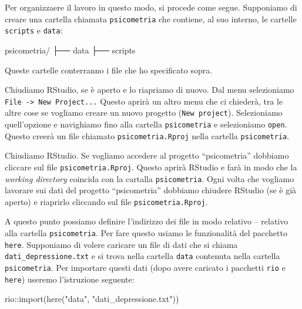 \documentclass[
]{memoir}
\newenvironment{Shaded}{\begin{snugshade}}{\end{snugshade}}
\newcommand{\FunctionTok}[1]{\textcolor[rgb]{0.00,0.00,0.00}{#1}}
\newcommand{\NormalTok}[1]{#1}
\newcommand{\SpecialCharTok}[1]{\textcolor[rgb]{0.00,0.00,0.00}{#1}}
\newcommand{\StringTok}[1]{\textcolor[rgb]{0.31,0.60,0.02}{#1}}
\theoremstyle{definition}
\theoremstyle{definition}
\theoremstyle{definition}
\theoremstyle{definition}
\theoremstyle{remark}
\begin{document}
Per organizzaere il lavoro in questo modo, si procede come segue. Supponiamo di creare una cartella chiamata \texttt{psicometria} che contiene, al suo interno, le cartelle \texttt{scripts} e \texttt{data}:

\begin{Shaded}
\begin{Highlighting}[]
\NormalTok{psicometria}\SpecialCharTok{/}
\NormalTok{  ├── data}
\NormalTok{  ├── scripts}
\end{Highlighting}
\end{Shaded}

Queste cartelle conterranno i file che ho specificato sopra.

Chiudiamo RStudio, se è aperto e lo riapriamo di nuovo. Dal menu selezioniamo \texttt{File\ -\textgreater{}\ New\ Project...} Questo aprirà un altro menu che ci chiederà, tra le altre cose se vogliamo creare un nuovo progetto (\texttt{New\ project}). Selezioniamo quell'opzione e navighiamo fino alla cartella \texttt{psicometria} e selezioniamo \texttt{open}. Questo creerà un file chiamato \texttt{psicometria.Rproj} nella cartella \texttt{psicometria}.

Chiudiamo RStudio. Se vogliamo accedere al progetto ``psicometria'' dobbiamo cliccare sul file \texttt{psicometria.Rproj}. Questo aprirà RStudio e farà in modo che la \emph{working directory} coincida con la cartalla \texttt{psicometria}. Ogni volta che vogliamo lavorare sui dati del progetto ``psicometria'' dobbiamo chiudere RStudio (se è già aperto) e riaprirlo cliccando sul file \texttt{psicometria.Rproj}.

A questo punto possiamo definire l'indirizzo dei file in modo relativo -- relativo alla cartella \texttt{psicometria}. Per fare questo usiamo le funzionalità del pacchetto \texttt{here}. Supponiamo di volere caricare un file di dati che si chiama \texttt{dati\_depressione.txt} e si trova nella cartella \texttt{data} contenuta nella cartella \texttt{psicometria}. Per importare questi dati (dopo avere caricato i pacchetti \texttt{rio} e \texttt{here}) useremo l'istruzione seguente:

\begin{Shaded}
\begin{Highlighting}[]
\NormalTok{rio}\SpecialCharTok{::}\FunctionTok{import}\NormalTok{(}\FunctionTok{here}\NormalTok{(}\StringTok{"data"}\NormalTok{, }\StringTok{"dati\_depressione.txt"}\NormalTok{))}
\end{Highlighting}
\end{Shaded}
\end{document}
